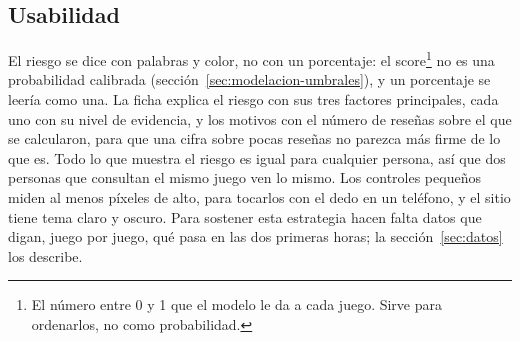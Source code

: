 \subsection{Usabilidad}\label{sec:estrategia-usabilidad}

El riesgo se dice con palabras y color, no con un porcentaje: el score\footnote{El número entre 0 y
1 que el modelo le da a cada juego. Sirve para ordenarlos, no como probabilidad.} no es una
probabilidad calibrada (sección~\ref{sec:modelacion-umbrales}), y un porcentaje se leería como una.
La ficha explica el riesgo con sus tres factores principales, cada uno con su nivel de evidencia, y los
motivos con el número de reseñas sobre el que se calcularon, para que una cifra sobre pocas reseñas
no parezca más firme de lo que es. Todo lo que muestra el riesgo es igual para cualquier persona,
así que dos personas que consultan el mismo juego ven lo mismo. Los controles pequeños miden al
menos \cifraObjetivoTactil{} píxeles de alto, para tocarlos con el dedo en un teléfono, y el sitio tiene tema claro y
oscuro. Para sostener esta estrategia hacen falta datos que digan, juego por juego, qué pasa en las
dos primeras horas; la sección~\ref{sec:datos} los describe.
